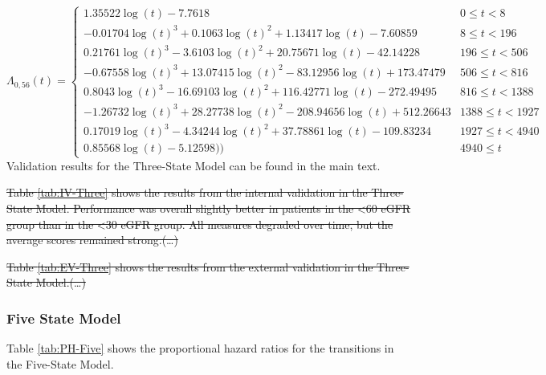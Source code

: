\documentclass[
]{article}
\begin{document}
\begin{equation}
\Lambda_{0,56}(t)=\begin{cases} 1.35522\log(t)-7.7618 & 0 \le t < 8 \\ -0.01704\log(t)^3+0.1063\log(t)^2+1.13417\log(t)-7.60859 & 8 \le t < 196 \\ 0.21761\log(t)^3-3.6103\log(t)^2+20.75671\log(t)-42.14228 & 196 \le t < 506 \\ -0.67558\log(t)^3+13.07415\log(t)^2-83.12956\log(t)+173.47479 & 506 \le t < 816 \\ 0.8043\log(t)^3-16.69103\log(t)^2+116.42771\log(t)-272.49495 & 816 \le t < 1388 \\ -1.26732\log(t)^3+28.27738\log(t)^2-208.94656\log(t)+512.26643 & 1388 \le t < 1927 \\ 0.17019\log(t)^3-4.34244\log(t)^2+37.78861\log(t)-109.83234 & 1927 \le t < 4940 \\ 0.85568\log(t)-5.12598)) & 4940 \le t \label{eq:CH-Three-56}\end{cases}
\end{equation}
Validation results for the Three-State Model can be found in the main text.

\sout{Table \ref{tab:IV-Three} shows the results from the internal validation in the Three-State Model. Performance was overall slightly better in patients in the \textless60 eGFR group than in the \textless30 eGFR group. All measures degraded over time, but the average scores remained strong.(\ldots)}

\sout{Table \ref{tab:EV-Three} shows the results from the external validation in the Three-State Model.(\ldots)}

\hypertarget{five-state-model}{%
\subsubsection{Five State Model}\label{five-state-model}}

Table \ref{tab:PH-Five} shows the proportional hazard ratios for the transitions in the Five-State Model.
\end{document}
